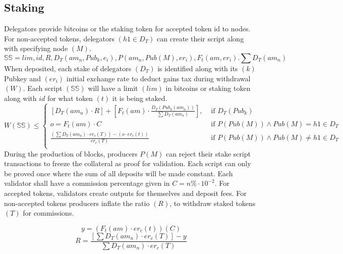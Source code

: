 \documentclass[../Bitcoin Blink.tex]{subfiles}
\begin{document}
\normalsize
\subsection{Staking}

Delegators provide bitcoins or the staking token for accepted token id to nodes. For non-accepted tokens, delegators $(h1 \in D_T)$ can create their script along with specifying node $(M)$.
\begin{equation*}
\mathbb{SS} = lim,id,R,D_T(am_n,Pub_k,e_i), P(am_n,Pub(M),er_i),F_t(am,er_i). \sum D_T(am_n)
\end{equation*}
When deposited, each stake of delegators $(D_T)$ is identified along with its $(k)$ Pubkey and $(er_i)$ initial exchange rate to deduct gains tax during withdrawal $(W)$. Each script $(\mathbb{SS})$ will have a limit $(lim)$ in bitcoins or staking token along with $id$ for what token $(t)$ it is being staked.
\begin{equation*}
W(\mathbb{SS}) \leq
\begin{cases} 
[D_T(am_n) \cdot R] + [F_t(am) \cdot \frac{D_T(Pub_k(am_n))}{\sum D_T(am_n)}]  , & \text{ if } D_T(Pub_k) \\
o=F_t(am) \cdot C & \text{ if } P(Pub(M)) \wedge Pub(M)= h1 \in D_T\\
\frac{(\sum D_T(am_n) \cdot er_c(T))-(o \cdot er_c(t))}{er_c(T)}  & \text{ if } P(Pub(M)) \wedge Pub(M)\neq h1 \in D_T\\
\end{cases}
\end{equation*}
During the production of blocks, producers $P(M)$ can reject their stake script transactions to freeze the collateral as proof for validation. Each script can only be proved once where the sum of all deposits will be made constant. Each validator shall have a commission percentage given in $C=n\% \cdot 10^{-2}$. For accepted tokens, validators create outputs for themselves and deposit fees. For non-accepted tokens producers inflate the ratio $(R)$, to withdraw staked tokens $(T)$ for commissions.

\begin{equation*}
y=(F_t(am) \cdot er_c(t))(C)
\end{equation*}
\begin{equation*}
R=\frac{[\sum D_T(am_n) \cdot er_c(T)]-y}{\sum D_T(am_n) \cdot er_c(T)}
\end{equation*}
\end{document}

